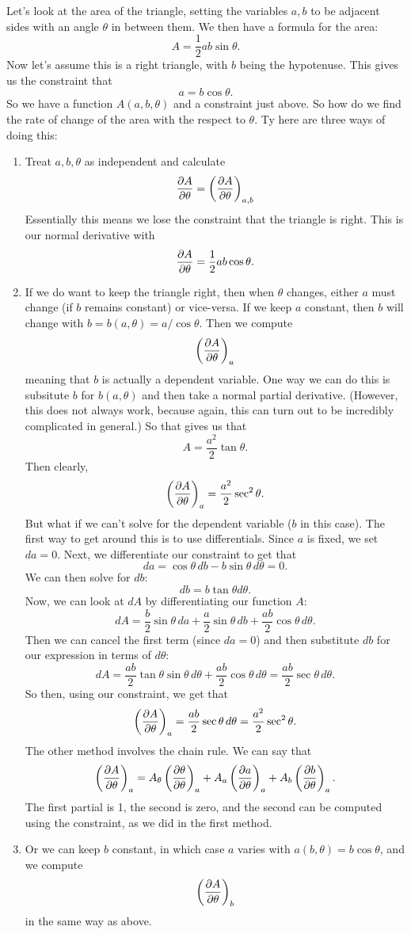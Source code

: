 \bex
Let's look at the area of the triangle, setting the variables $a,b$ to be adjacent sides with an angle $\theta$ in between them. We then have a formula for the area:
\[ A = \frac 12 ab\sin\theta. \]
Now let's assume this is a right triangle, with $b$ being the hypotenuse. This gives us the constraint that 
\[ a = b\cos \theta. \]
So we have a function $A(a,b,\theta)$ and a constraint just above. So how do we find the rate of change of the area with the respect to $\theta$. Ty here are three ways of doing this:
\begin{enumerate}
\item Treat $a,b,\theta$ as independent and calculate 
\[ \frac{\partial A}{\partial\theta} = \left(\frac{\partial A}{\partial\theta}\right)_{a,b} \]
Essentially this means we lose the constraint that the triangle is right. This is our normal derivative with
\[ \frac{\partial A}{\partial\theta} = \frac 12 ab \cos \theta. \]
\item If we do want to keep the triangle right, then when $\theta$ changes, either $a$ must change (if $b$ remains constant) or vice-versa. If we keep $a$ constant, then $b$ will change with $b=b(a,\theta)=a/\cos\theta$. Then we compute
\[ \left(\frac{\partial A}{\partial\theta}\right)_a \]
meaning that $b$ is actually a dependent variable. One way we can do this is subsitute $b$ for $b(a,\theta)$ and then take a normal partial derivative. (However, this does not always work, because again, this can turn out to be incredibly complicated in general.) So that gives us that 
\[ A = \frac{a^2}2 \tan \theta. \]
Then clearly,
\[ \left(\frac{\partial A}{\partial\theta}\right)_a = \frac{a^2}2 \sec ^2 \theta. \]
But what if we can't solve for the dependent variable ($b$ in this case). The first way to get around this is to use differentials. Since $a$ is fixed, we set $da = 0$. Next, we differentiate our constraint to get that
\[ da = \cos \theta \, db - b \sin \theta\, d\theta = 0. \]
We can then solve for $db$:
\[ db = b \tan \theta d\theta. \]
Now, we can look at $dA$ by differentiating our function $A$:
\[ dA = \frac b2 \sin \theta \, da + \frac a2 \sin \theta \, db + \frac {ab}2 \cos \theta \, d\theta. \]
Then we can cancel the first term (since $da = 0$) and then substitute $db$ for our expression in terms of $d\theta$:
\[ dA = \frac {ab}2 \tan \theta \sin \theta \, d\theta + \frac {ab}2 \cos \theta \, d \theta = \frac{ab}2 \sec \theta\, d \theta. \]
So then, using our constraint, we get that 
\[ \left(\frac{\partial A}{\partial\theta}\right)_a = \frac{ab}2 \sec \theta \, d \theta = \frac{a^2}2 \sec^2 \theta. \]
The other method involves the chain rule. We can say that 
\[ \left(\frac{\partial A}{\partial\theta}\right)_a = A_{\theta} \left(\frac{\partial\theta}{\partial\theta}\right)_a + A_a \left(\frac{\partial a}{\partial\theta}\right)_a + A_b \left(\frac{\partial b}{\partial\theta}\right)_a. \]
The first partial is 1, the second is zero, and the second can be computed using the constraint, as we did in the first method. 
\item Or we can keep $b$ constant, in which case $a$ varies with $a(b,\theta)=b\cos\theta$, and we compute
\[ \left(\frac{\partial A}{\partial\theta}\right)_b \]
in the same way as above. 
\end{enumerate}
\eex